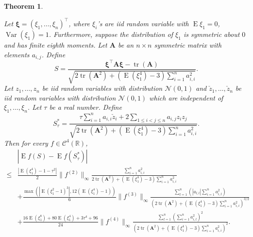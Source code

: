 \documentclass[11pt]{article}
\DeclareMathOperator{\mytr}{tr}
\DeclareMathOperator{\myE}{E}
\DeclareMathOperator{\myVar}{Var}
\newcommand{\BA}{\mathbf{A}}    \newcommand{\BB}{\mathbf{B}}    \newcommand{\BC}{\mathbf{C}}    \newcommand{\BD}{\mathbf{D}}    \newcommand{\BE}{\mathbf{E}}    \newcommand{\BF}{\mathbf{F}}    \newcommand{\BG}{\mathbf{G}}    \newcommand{\BH}{\mathbf{H}}    \newcommand{\BI}{\mathbf{I}}    \newcommand{\BJ}{\mathbf{J}}    \newcommand{\BK}{\mathbf{K}}    \newcommand{\BL}{\mathbf{L}}
\newcommand{\bfsym}[1]{\ensuremath{\boldsymbol{#1}}}
\def\bxi{\bfsym {\xi}}
\theoremstyle{plain}
\newtheorem{theorem}{\quad\quad Theorem}
\theoremstyle{definition}
\theoremstyle{remark}
\begin{document}
\begin{theorem}\label{TheoremLindeberg}

    Let $\bxi=(\xi_1,\ldots,\xi_n)^\top$, where $\xi_i$'s are iid random variable with $\myE \xi_1=0$, $\myVar (\xi_1)=1$.
    Furthermore, suppose the distribution of  $\xi_1$ is symmetric about $0$ and has finite eighth moments.
    Let $\BA$ be an $n\times n$ symmetric matrix with elements $a_{i,j}$.
Define
    \begin{equation*}
        S=\frac{
            \bxi^\top \BA \bxi-\mytr (\BA)
        }{
            \sqrt{
    2 \mytr(\BA^2)
    +
    (\myE (\xi_1^4)-3)\sum_{i=1}^n a_{i,i}^2
            }             
        }.
    \end{equation*}
    Let $z_1,\ldots,z_n$  be iid random variables with distribution $\mathcal N (0, 1) $ and $\check z_1, \ldots, \check z_n$ be iid random variables with distribution $\mathcal N (0,1)$ which are independent of $\xi_1,\ldots, \xi_n$.
    Let $\tau$ be a real number.
    Define
    \begin{equation*}
        S_\tau^* =
        \frac{
            \tau \sum_{i=1}^n  a_{i,i}\check z_i
        +2\sum_{1\leq i <j \leq n} a_{i,j} z_i z_j
    }
    {
            \sqrt{
    2 \mytr(\BA^2)
    +
    (\myE (\xi_1^4)-3) \sum_{i=1}^n a_{i,i}^2
            }             
        }.
    \end{equation*}
    Then for every $f\in \mathscr C^4(\mathbb R)$,
    \begin{equation}\label{eq:longInequality}
        \begin{split}
             &
              \left| \myE f(S)-\myE f(S_\tau^*)\right|
             \\
\leq&
\frac{
\left|
\myE (\xi_1^4)-1
            -
            \tau^2
\right|
}{2}
\|f^{(2)}\|_\infty
\frac{
    \sum_{i=1}^n a_{i,i}^2
}{
    2 \mytr(\BA^2)
    +
    (\myE (\xi_1^4)-3) \sum_{i=1}^n a_{i,i}^2
}
\\
&
            +
            \frac{
            \max\left(
    \left|\myE (\xi_1^2-1)^3\right|
            ,
12 (\myE (\xi_1^4)-1)
        \right)
            }{6} \|f^{(3)}\|_\infty
            \frac{
            \sum_{l=1}^n 
            \left(|a_{l,l}|
         \sum_{i=1}^{n} a_{i,l}^2 
     \right)
 }{
    \left(
        2 \mytr(\BA^2)
    +
    (\myE (\xi_1^4)-3) \sum_{i=1}^n a_{i,i}^2
\right)^{3/2}
 }
         \\
            &+
            \frac{
             16 \myE (\xi_1^8) + 80 \myE (\xi_1^4) + 3\tau^4 + 96 
            }{24} \|f^{(4)} \|_{\infty} 
            \frac{
                \sum_{l=1}^n \left( \sum_{i=1}^n a_{i,l}^2 \right)^2
            }{
            \left(
        2 \mytr(\BA^2)
    +
    (\myE (\xi_1^4)-3)\sum_{i=1}^n a_{i,i}^2
\right)^{2}
            }
            .
        \end{split}
    \end{equation}
    \label{approximation}
\end{theorem}
\end{document}
